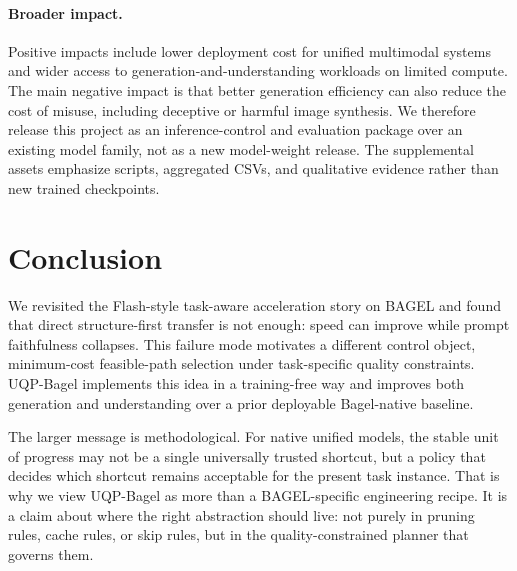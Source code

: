 \documentclass{article}
\begin{document}
\paragraph{Broader impact.} Positive impacts include lower deployment cost for unified multimodal systems and wider access to generation-and-understanding workloads on limited compute. The main negative impact is that better generation efficiency can also reduce the cost of misuse, including deceptive or harmful image synthesis. We therefore release this project as an inference-control and evaluation package over an existing model family, not as a new model-weight release. The supplemental assets emphasize scripts, aggregated CSVs, and qualitative evidence rather than new trained checkpoints.
\section{Conclusion}
We revisited the Flash-style task-aware acceleration story on BAGEL and found that direct structure-first transfer is not enough: speed can improve while prompt faithfulness collapses. This failure mode motivates a different control object, minimum-cost feasible-path selection under task-specific quality constraints. UQP-Bagel implements this idea in a training-free way and improves both generation and understanding over a prior deployable Bagel-native baseline.

The larger message is methodological. For native unified models, the stable unit of progress may not be a single universally trusted shortcut, but a policy that decides which shortcut remains acceptable for the present task instance. That is why we view UQP-Bagel as more than a BAGEL-specific engineering recipe. It is a claim about where the right abstraction should live: not purely in pruning rules, cache rules, or skip rules, but in the quality-constrained planner that governs them.
\end{document}
